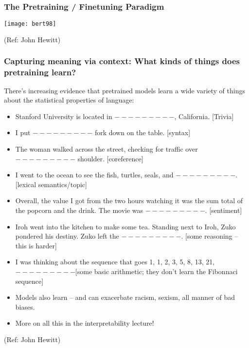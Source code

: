 \begin{frame}[fragile]\frametitle{The Pretraining / Finetuning Paradigm}

			
			\begin{center}
			\texttt{[image: bert98]}
			\end{center}		
			
			{\tiny (Ref: John Hewitt)}

\end{frame}

\begin{frame}[fragile]\frametitle{Capturing meaning via context: What kinds of things does pretraining learn?}

There’s increasing evidence that pretrained models learn a wide variety of things about
the statistical properties of language:

      \begin{itemize}
			\item Stanford University is located in $---------$, California. [Trivia]
			\item I put $---------$ fork down on the table. [syntax]
			\item The woman walked across the street, checking for traffic over $---------$ shoulder. [coreference]
			\item I went to the ocean to see the fish, turtles, seals, and $---------$.	[lexical semantics/topic]
			\item Overall, the value I got from the two hours watching it was the sum total of the popcorn and the drink. The movie was $---------$. [sentiment]
			\item Iroh went into the kitchen to make some tea. Standing next to Iroh, Zuko pondered his  destiny. Zuko left the $---------$. [some reasoning – this is harder]
			\item I was thinking about the sequence that goes 1, 1, 2, 3, 5, 8, 13, 21, $---------$[some basic
arithmetic; they don’t learn the Fibonnaci sequence]
			\item Models also learn – and can exacerbate racism, sexism, all manner of bad biases.
			\item More on all this in the interpretability lecture!

			\end{itemize}

			{\tiny (Ref: John Hewitt)}

\end{frame}

